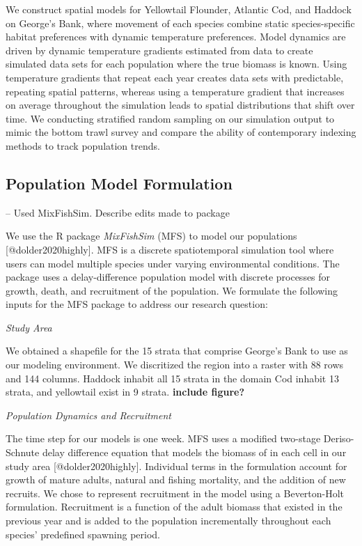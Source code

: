 \documentclass[
  12pt,
]{article}
\begin{document}
We construct spatial models for Yellowtail Flounder, Atlantic Cod, and Haddock on George's Bank, where movement of each species combine static species-specific habitat preferences with dynamic temperature preferences. Model dynamics are driven by dynamic temperature gradients estimated from data to create simulated data sets for each population where the true biomass is known. Using temperature gradients that repeat each year creates data sets with predictable, repeating spatial patterns, whereas using a temperature gradient that increases on average throughout the simulation leads to spatial distributions that shift over time. We conducting stratified random sampling on our simulation output to mimic the bottom trawl survey and compare the ability of contemporary indexing methods to track population trends.

\subsection{Population Model Formulation}

-- Used MixFishSim. Describe edits made to package

We use the R package \emph{MixFishSim} (MFS) to model our populations {[}@dolder2020highly{]}. MFS is a discrete spatiotemporal simulation tool where users can model multiple species under varying environmental conditions. The package uses a delay-difference population model with discrete processes for growth, death, and recruitment of the population. We formulate the following inputs for the MFS package to address our research question:

\emph{Study Area}

We obtained a shapefile for the 15 strata that comprise George's Bank to use as our modeling environment. We discritized the region into a raster with 88 rows and 144 columns. Haddock inhabit all 15 strata in the domain Cod inhabit 13 strata, and yellowtail exist in 9 strata. \textbf{include figure?}

\emph{Population Dynamics and Recruitment}

The time step for our models is one week. MFS uses a modified two-stage Deriso-Schnute delay difference equation that models the biomass of in each cell in our study area {[}@dolder2020highly{]}. Individual terms in the formulation account for growth of mature adults, natural and fishing mortality, and the addition of new recruits. We chose to represent recruitment in the model using a Beverton-Holt formulation. Recruitment is a function of the adult biomass that existed in the previous year and is added to the population incrementally throughout each species' predefined spawning period.
\end{document}
